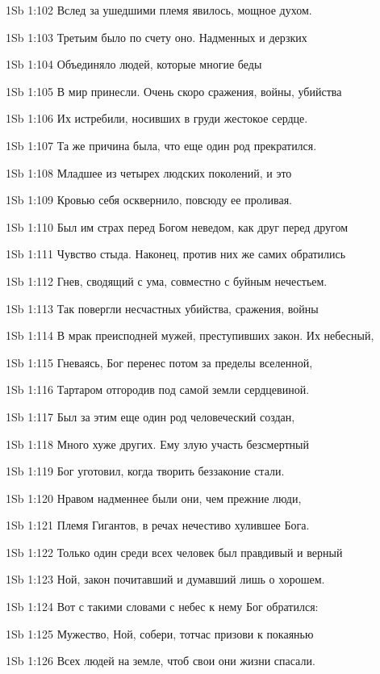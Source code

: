 \vs 1Sb 1:102 Вслед за ушедшими племя явилось, мощное духом.

\vs 1Sb 1:103 Третьим было по счету оно. Надменных и дерзких

\vs 1Sb 1:104 Объединяло людей, которые многие беды

\vs 1Sb 1:105 В мир принесли. Очень скоро сражения, войны, убийства

\vs 1Sb 1:106 Их истребили, носивших в груди жестокое сердце.

\vs 1Sb 1:107 Та же причина была, что еще один род прекратился.

\vs 1Sb 1:108 Младшее из четырех людских поколений, и это

\vs 1Sb 1:109 Кровью себя осквернило, повсюду ее проливая.

\vs 1Sb 1:110 Был им страх перед Богом неведом, как друг перед другом 

\vs 1Sb 1:111 Чувство стыда. Наконец, против них же самих обратились

\vs 1Sb 1:112 Гнев, сводящий с ума, совместно с буйным нечестьем.

\vs 1Sb 1:113 Так повергли несчастных убийства, сражения, войны

\vs 1Sb 1:114 В мрак преисподней  мужей, преступивших закон. Их небесный,

\vs 1Sb 1:115 Гневаясь, Бог перенес потом за пределы вселенной,

\vs 1Sb 1:116 Тартаром отгородив под самой земли сердцевиной.

\vs 1Sb 1:117 Был за этим еще один род человеческий создан,

\vs 1Sb 1:118 Много хуже других. Ему злую участь безсмертный

\vs 1Sb 1:119 Бог уготовил, когда творить беззаконие стали.

\vs 1Sb 1:120 Нравом надменнее были они, чем прежние люди, 

\vs 1Sb 1:121 Племя Гигантов, в речах нечестиво хулившее Бога.

\vs 1Sb 1:122 Только один среди всех человек был правдивый и верный 

\vs 1Sb 1:123 Ной, закон почитавший и думавший лишь о хорошем.

\vs 1Sb 1:124 Вот с такими словами с небес к нему Бог обратился:

\vs 1Sb 1:125 Мужество, Ной, собери, тотчас призови к покаянью

\vs 1Sb 1:126 Всех людей на земле, чтоб свои они жизни спасали.

